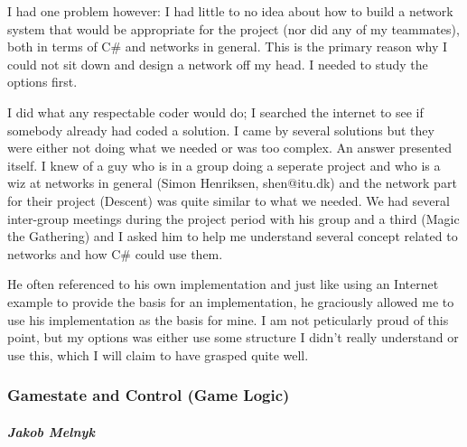I had one problem however: I had little to no idea about how to build a network system that would be appropriate for the project (nor did any of my teammates), both in terms of C# and networks in general. 
This is the primary reason why I could not sit down and design a network off my head. I needed to study the options first.

I did what any respectable coder would do; I searched the internet to see if somebody already had coded a solution. 
I came by several solutions but they were either not doing what we needed or was too complex.
An answer presented itself. I knew of a guy who is in a group doing a seperate project and who is a wiz at networks in general (Simon Henriksen, shen@itu.dk) and the network part for their project (Descent) was quite similar to what we needed. 
We had several inter-group meetings during the project period with his group and a third (Magic the Gathering) and I asked him to help me understand several concept related to networks and how C# could use them.

He often referenced to his own implementation and just like using an Internet example to provide the basis for an implementation, he graciously allowed me to use his implementation as the basis for mine.
I am not peticularly proud of this point, but my options was either use some structure I didn't really understand or use this, which I will claim to have grasped quite well.

\subsubsection{Gamestate and Control (Game Logic)}
\subparagraph{Jakob Melnyk}

